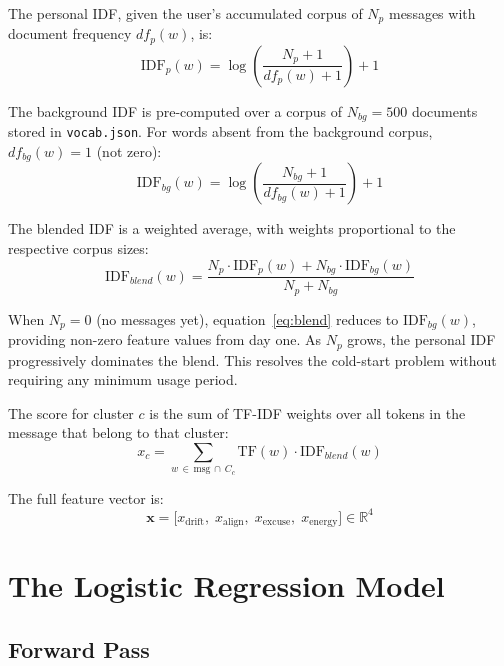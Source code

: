 \documentclass[11pt, a4paper]{report}
\begin{document}
The personal IDF, given the user's accumulated corpus of $N_p$ messages
with document frequency $df_p(w)$, is:
\begin{equation}
  \mathrm{IDF}_p(w) = \log\!\left(\frac{N_p + 1}{df_p(w) + 1}\right) + 1
\end{equation}

The background IDF is pre-computed over a corpus of $N_{bg} = 500$
documents stored in \texttt{vocab.json}. For words absent from the
background corpus, $df_{bg}(w) = 1$ (not zero):
\begin{equation}
  \mathrm{IDF}_{bg}(w) = \log\!\left(\frac{N_{bg} + 1}{df_{bg}(w) + 1}
  \right) + 1
\end{equation}

The blended IDF is a weighted average, with weights proportional to the
respective corpus sizes:
\begin{equation}
  \mathrm{IDF}_{blend}(w)
  = \frac{N_p \cdot \mathrm{IDF}_p(w) + N_{bg} \cdot \mathrm{IDF}_{bg}(w)}
         {N_p + N_{bg}}
  \label{eq:blend}
\end{equation}

When $N_p = 0$ (no messages yet), equation~\eqref{eq:blend} reduces to
$\mathrm{IDF}_{bg}(w)$, providing non-zero feature values from day one.
As $N_p$ grows, the personal IDF progressively dominates the blend. This
resolves the cold-start problem without requiring any minimum usage period.

The score for cluster $c$ is the sum of TF-IDF weights over all tokens in
the message that belong to that cluster:
\begin{equation}
  x_c = \sum_{w \,\in\, \text{msg} \,\cap\, C_c}
        \mathrm{TF}(w) \cdot \mathrm{IDF}_{blend}(w)
\end{equation}

The full feature vector is:
\begin{equation}
  \mathbf{x}
  = \bigl[x_{\mathrm{drift}},\;
    x_{\mathrm{align}},\;
    x_{\mathrm{excuse}},\;
    x_{\mathrm{energy}}\bigr]
  \in \mathbb{R}^4
\end{equation}

\section{The Logistic Regression Model}

\subsection{Forward Pass}
\end{document}
